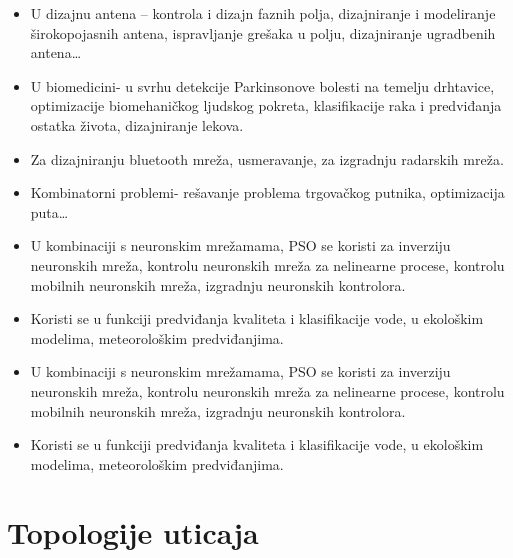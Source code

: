 \documentclass[a4paper]{article}
\begin{document}
\begin{itemize}
    \item U dizajnu antena – kontrola i dizajn faznih polja, dizajniranje i modeliranje širokopojasnih antena, ispravljanje grešaka u polju, dizajniranje ugradbenih antena…
    \item U biomedicini- u svrhu detekcije Parkinsonove bolesti na temelju drhtavice, optimizacije biomehaničkog ljudskog pokreta, klasifikacije raka i predviđanja ostatka života, dizajniranje lekova.
    \item Za dizajniranju bluetooth mreža, usmeravanje, za izgradnju radarskih mreža.
    \item Kombinatorni problemi- rešavanje problema trgovačkog putnika, optimizacija puta…
    \item U kombinaciji s neuronskim mrežamama, PSO se koristi za inverziju neuronskih mreža, kontrolu neuronskih mreža za nelinearne procese,  kontrolu mobilnih neuronskih mreža, izgradnju neuronskih kontrolora.
    \item Koristi se u funkciji predviđanja kvaliteta i klasifikacije vode, u ekološkim modelima, meteorološkim predviđanjima.
    \item U kombinaciji s neuronskim mrežamama, PSO se koristi za inverziju neuronskih mreža, kontrolu neuronskih mreža za nelinearne procese,  kontrolu mobilnih neuronskih mreža, izgradnju neuronskih kontrolora.
    \item Koristi se u funkciji predviđanja kvaliteta i klasifikacije vode, u ekološkim modelima, meteorološkim predviđanjima.
     
   
\end{itemize}
\section{Topologije uticaja}

\appendix
 

\end{document}
